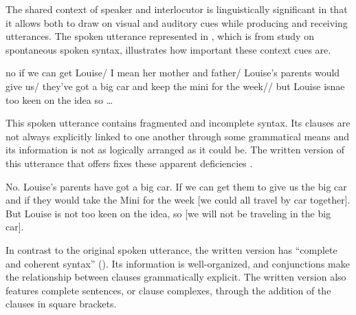 The shared context of speaker and interlocutor is linguistically significant in that it allows both to draw on visual and auditory cues while producing and receiving utterances. The spoken utterance represented in , which is from  study on spontaneous spoken syntax, illustrates how important these context cues are.

\ea%
    \label{ex:3:6}
         no if we can get Louise/ I mean her mother and father/ Louise’s parents would give us/ they’ve got a big car and keep the mini for the week// but Louise isnae too keen on the idea so …
    \z

\noindent This spoken utterance contains fragmented and incomplete syntax. Its clauses are not always explicitly linked to one another through some grammatical means and its information is not as logically arranged as it could be. The written version of this utterance that \citet{MillerWeinert1998} offers fixes these apparent deficiencies .

\ea%
    \label{ex:3:7}
         No. Louise’s parents have got a big car. If we can get them to give us the big car and if they would take the Mini for the week [we could all travel by car together]. But Louise is not too keen on the idea, so [we will not be traveling in the big car].
    \z

\noindent In contrast to the original spoken utterance, the written version has “complete and coherent syntax” (\citealt[60]{MillerWeinert1998}). Its information is well\hyp organized, and conjunctions make the relationship between clauses grammatically explicit. The written version also features complete sentences, or clause complexes, through the addition of the clauses in square brackets.


